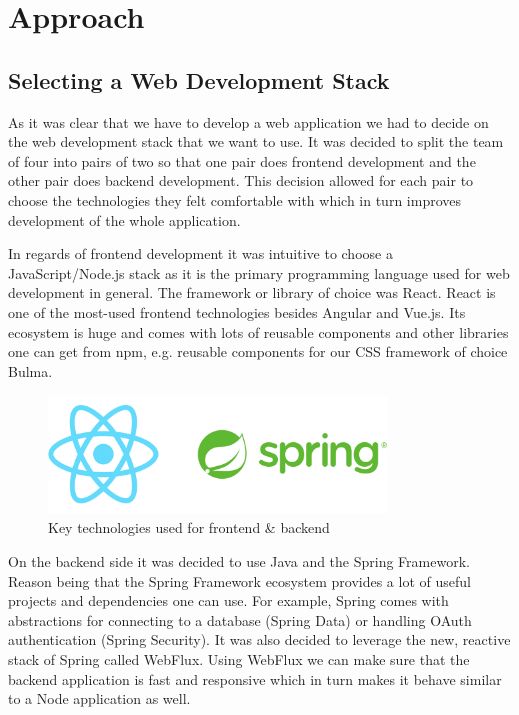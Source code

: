 \chapter{Approach}
\label{ch:Approach}

\section{Selecting a Web Development Stack}

As it was clear that we have to develop a web application we had to decide on the web development stack that we want to use. It was decided to split the team of four into pairs of two so that one pair does frontend development and the other pair does backend development. This decision allowed for each pair to choose the technologies they felt comfortable with which in turn improves development of the whole application.

In regards of frontend development it was intuitive to choose a JavaScript/Node.js stack as it is the primary programming language used for web development in general. The framework or library of choice was React. React is one of the most-used frontend technologies besides Angular and Vue.js. Its ecosystem is huge and comes with lots of reusable components and other libraries one can get from npm, e.g. reusable components for our CSS framework of choice Bulma.

\begin{figure}[bth]
    \centering
    \includegraphics[width=0.8\textwidth]{Graphics/Chapter2/frontend-backend-stack.png}
    \caption{Key technologies used for frontend \& backend}
\end{figure}

On the backend side it was decided to use Java and the Spring Framework. Reason being that the Spring Framework ecosystem provides a lot of useful projects and dependencies one can use. For example, Spring comes with abstractions for connecting to a database (Spring Data) or handling OAuth authentication (Spring Security). It was also decided to leverage the new, reactive stack of Spring called WebFlux. Using WebFlux we can make sure that the backend application is fast and responsive which in turn makes it behave similar to a Node application as well.

